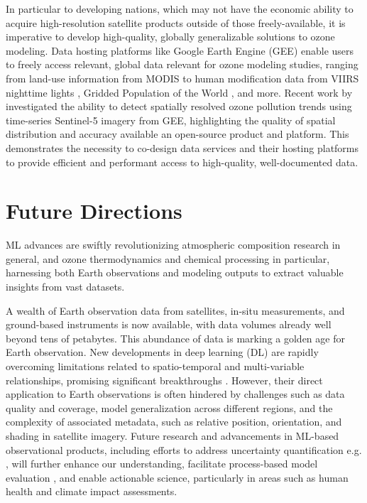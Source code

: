 \documentclass[gmd, manuscript]{copernicus}
\begin{document}
In particular to developing nations, which may not have the economic ability to acquire high-resolution satellite products outside of those freely-available, it is imperative to develop high-quality, globally generalizable solutions to ozone modeling. Data hosting platforms like Google Earth Engine (GEE) enable users to freely access relevant, global data relevant for ozone modeling studies, ranging from land-use information from MODIS \citep{Friedl2021} to human modification data from VIIRS nighttime lights \citep{Elvidge2017}, Gridded Population of the World \citep{CIESIN2018}, and more. Recent work by \citet{Garajeh2023} investigated the ability to detect spatially resolved ozone pollution trends using time-series Sentinel-5 imagery from GEE, highlighting the quality of spatial distribution and accuracy available an open-source product and platform. This demonstrates the necessity to co-design data services and their hosting platforms to provide efficient and performant access to high-quality, well-documented data. 


\section{Future Directions}
ML advances are swiftly revolutionizing atmospheric composition research in general, and ozone thermodynamics and chemical processing in particular, harnessing both Earth observations and modeling outputs to extract valuable insights from vast datasets.

A wealth of Earth observation data from satellites, in-situ measurements, and ground-based instruments is now available, with data volumes already well beyond tens of petabytes. This abundance of data is marking a golden age for Earth observation. New developments in deep learning (DL) are rapidly overcoming limitations related to spatio-temporal and multi-variable relationships, promising significant breakthroughs \citep{Eyring2024}. However, their direct application to Earth observations is often hindered by challenges such as data quality and coverage, model generalization across different regions, and the complexity of associated metadata, such as relative position, orientation, and shading in satellite imagery. Future research and advancements in ML-based observational products, including efforts to address uncertainty quantification e.g. \citep{Haynes2023}, will further enhance our understanding, facilitate process-based model evaluation \citep{Nowack2020}, and enable actionable science, particularly in areas such as human health \citep{Fleming2018} and climate impact \citep{Gaudel2018} assessments.
\end{document}
